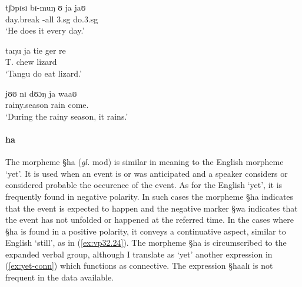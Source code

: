\begin{exe}
\ex\label{ex:GRM-prev-hab}
\begin{xlist}

\ex\label{ex:GRM-prev-hab-do}
\gll tʃɔpɪsɪ bɪ-muŋ ʊ ja jaʊ \\
 day.break {\itr}-all {\sc 3.sg} {\hab} do.{\sc 3.sg}\\
\glt `He does it every day.'

\ex
\gll taŋu ja tie ger re\\
T.  {\hab} chew lizard {\foc}\\
\glt `Tangu do eat lizard.'

\ex
\gll jʊʊ nɪ dʊɔŋ ja waaʊ\\
rainy.season {\postp} rain  {\hab} come.{\foc} \\
\glt `During the rainy season, it rains.'
\end{xlist}
\end{exe}





\paragraph{ha}
\label{sec:GRM-preverb-yet}

The morpheme {\S ha} ({\it gl.} {\sc mod}) is similar in meaning to the English
morpheme `yet'. It is used when an event is or was anticipated and a speaker
considers or considered probable the occurence of the event. As  for the English
`yet', it is frequently found in negative polarity. In such cases the morpheme
{\S ha} indicates that the event is expected to happen and the negative marker
{\S wa} indicates that the event has not unfolded or happened at the referred
time. In the cases where {\S ha} is found in a positive polarity,  it  conveys 
a continuative aspect, similar to English `still',  as in 
(\ref{ex:vp32.24}). The
morpheme  {\S ha} is circumscribed to the expanded verbal group, although I
translate as `yet'  another expression in (\ref{ex:yet-conn}) which
functions as connective. The expression {\S haalɪ} is not frequent in the data
available. 

